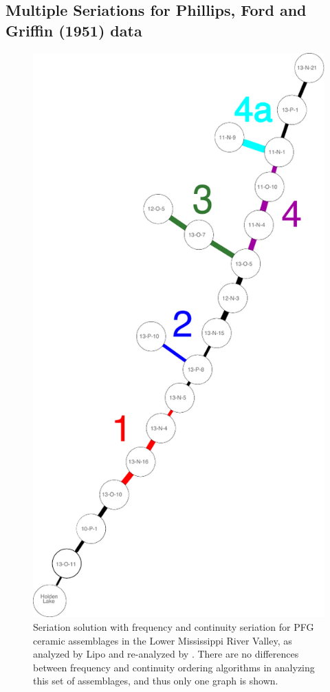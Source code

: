 \documentclass[graybox,natbib]{svmult}
\begin{document}
\subsection{Multiple Seriations for Phillips, Ford and Griffin (1951)
data}\label{multiple-seriations-for-phillips-ford-and-griffin-1951-data}

\begin{figure}[ht]
\centering
\includegraphics[scale=0.5]{pfg-minmax-network-both-solutions.pdf}
\caption{Seriation solution with frequency and continuity seriation for PFG \citeyearpar{Phillips1951} ceramic assemblages in 
the Lower Mississippi River Valley, as analyzed by Lipo \citeyearpar{Lipo2001a} and re-analyzed by \citet{lipomadsendunnell2015}.  There are no differences between frequency and continuity ordering algorithms in analyzing this set of assemblages, and thus only one graph is shown.}
\label{img:pfg-both-solutions}
\end{figure}
\end{document}

